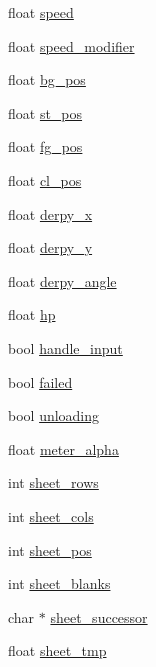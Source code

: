 \begin{DoxyCompactItemize}
\begin{tabbing}
\end{tabbing}\item 
float \hyperlink{structLevel_a936a1d131d1e056878474ca831c5e88f}{speed}
\item 
float \hyperlink{structLevel_a0f6fa70a2e0b85437dc1973d1409381f}{speed\-\_\-modifier}
\item 
float \hyperlink{structLevel_a00321214fdc30f67615053d1ca614948}{bg\-\_\-pos}
\item 
float \hyperlink{structLevel_ab13f799d9e2e06a04debbd97676fb512}{st\-\_\-pos}
\item 
float \hyperlink{structLevel_a665bb93951ab6b7a91543712152a3acf}{fg\-\_\-pos}
\item 
float \hyperlink{structLevel_af466533be369b5ce1f48196a7f3b7b0b}{cl\-\_\-pos}
\item 
float \hyperlink{structLevel_ae5a97d5b61c70c63e93992a9ff3935f9}{derpy\-\_\-x}
\item 
float \hyperlink{structLevel_a7b3c0f5af134797a1ed21ef48da3ab00}{derpy\-\_\-y}
\item 
float \hyperlink{structLevel_a364d35d138549a87532d959288283956}{derpy\-\_\-angle}
\item 
float \hyperlink{structLevel_a49df009e8113251cfcb48fe17df0b571}{hp}
\item 
bool \hyperlink{structLevel_a06cf4f2da517284d2006540051d3e5c0}{handle\-\_\-input}
\item 
bool \hyperlink{structLevel_a5bea34b31777260f1b23a1d64e6cd865}{failed}
\item 
bool \hyperlink{structLevel_a058680deb984491fa71d2f212f8025ae}{unloading}
\item 
float \hyperlink{structLevel_a246ce1ecf1523db218cf067df15e511f}{meter\-\_\-alpha}
\item 
int \hyperlink{structLevel_a6d608b79c9b4dd8a5efc0c7e5fb482b0}{sheet\-\_\-rows}
\item 
int \hyperlink{structLevel_a8a5c443169a4ff15f330a65473eedb1b}{sheet\-\_\-cols}
\item 
int \hyperlink{structLevel_a21c699af201ffe60ccd1319b3f540947}{sheet\-\_\-pos}
\item 
int \hyperlink{structLevel_aebaaba311e5d4842fdbd8c50edd40808}{sheet\-\_\-blanks}
\item 
char $\ast$ \hyperlink{structLevel_adfecc93d9f14b4725534aa36f5a79c64}{sheet\-\_\-successor}
\item 
float \hyperlink{structLevel_a22e80ea91fd267dae85c0457e581d072}{sheet\-\_\-tmp}
\item 

\end{DoxyCompactItemize}
